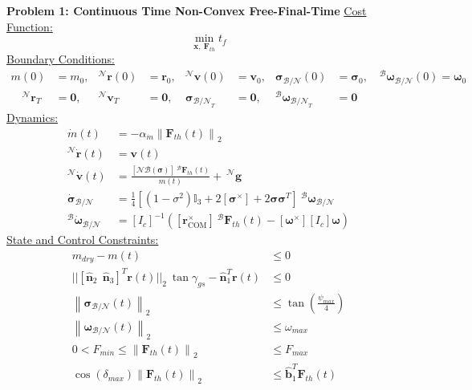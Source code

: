 \documentclass[conf]{new-aiaa}
\begin{document}
\clearpage
\begin{mdframed}
\label{ctproblem}
\textbf{Problem 1: Continuous Time Non-Convex Free-Final-Time}
\newline
\underline{Cost Function:}
\begin{equation*}
\min_{\mathbf{x}, \ \mathbf{F}_{th}} t_f
\end{equation*}
%
\underline{Boundary Conditions:}  
\begin{align*}
m(0) &= m_0, &^\mathcal{N}\mathbf{r}(0) &= \mathbf{r}_0, & ^\mathcal{N}\mathbf{v}(0) &= \mathbf{v}_0, & \boldsymbol{\sigma}_\mathcal{B/N}(0) &= \boldsymbol{\sigma}_0, \quad ^\mathcal{B}\boldsymbol{\omega}_\mathcal{B/N}(0) = \boldsymbol{\omega}_0 \\
\quad ^\mathcal{N}\mathbf{r}_{T} &= \mathbf{0}, & ^\mathcal{N}\mathbf{v}_T &= \mathbf{0}, & \boldsymbol{\sigma}_{\mathcal{B/N}_T} &= \mathbf{0}, & ^\mathcal{B}\boldsymbol{\omega}_{\mathcal{B/N}_{T}} &= \mathbf{0}
\end{align*}
%
\underline{Dynamics:}  
\begin{align*}
\dot{m}(t) &= -\alpha_{\dot{m}} \left\lVert \mathbf{F}_{th}(t) \right\rVert _2 \\
^\mathcal{N}\dot{\mathbf{r}}(t) &= \mathbf{v}(t) \\
^\mathcal{N}\dot{\mathbf{v}}(t) &= \frac{[\mathcal{NB}(\boldsymbol{\sigma})] \ ^\mathcal{B}\mathbf{F}_{th}(t)}{m(t)} +  \ ^\mathcal{N}\mathbf{g} \\
\dot{\boldsymbol{\sigma}}_\mathcal{B/N} &= \frac{1}{4} \left [(1-\sigma^2)\mathbb{I}_3 +  2[\boldsymbol{\sigma}^\times] + 2\boldsymbol{\sigma}\boldsymbol{\sigma}^T \right ] \ ^\mathcal{B}\boldsymbol{\omega}_\mathcal{B/N} \\
^\mathcal{B}\dot{\boldsymbol{\omega}}_\mathcal{B/N} &= [I_c]^{-1}\left([\boldsymbol{r}_{\text{COM}}^\times] \ ^\mathcal{B}\mathbf{F}_{th}(t) - [\boldsymbol{\omega}^\times][I_c]\boldsymbol{\omega}\right)
\end{align*}
%
\underline{State and Control Constraints:}  
\begin{align*}
m_{dry} - m(t) & \leq 0 \\
|| [\hat{\bm{n}}_2 \ \ \hat{\bm{n}}_3 ]^T \mathbf{r}(t) \lvert\lvert_2 \ \tan{\gamma_{gs}}  - \hat{\bm{n}}_1^T \mathbf{r}(t) & \leq 0 \\
%
\left \lVert \boldsymbol{\sigma}_\mathcal{B/N} (t) \right \lVert_2 &\leq \tan \left( \frac{\psi_{max}}{4} \right) \\
%
\left \lVert \bm{\omega}_\mathcal{B/N}(t) \right \lVert_2 & \leq \omega_{max}\\
0 < F_{min} \leq \left \lVert \bm{F}_{th}(t) \right \lVert_2 &\leq F_{max} \\
\cos(\delta_{max}) \left \lVert \bm{F}_{th}(t) \right \lVert_2 &\leq \hat{\bm{b}}_1^T \bm{F}_{th}(t)
\end{align*}
\end{mdframed}
\end{document}
